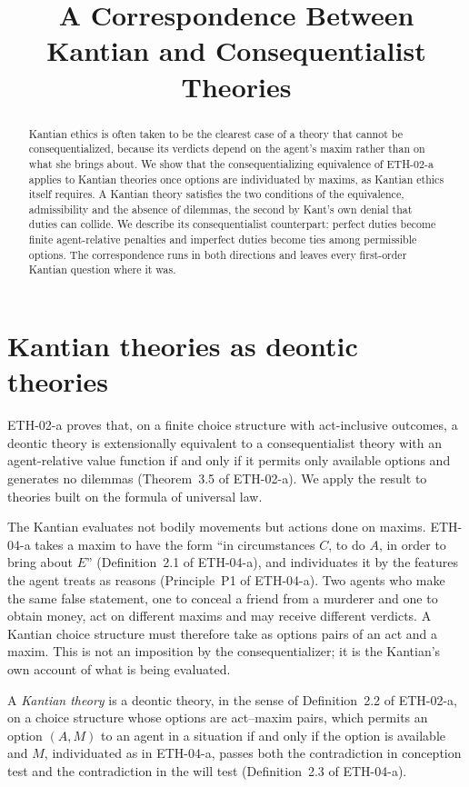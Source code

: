 \documentclass{situationist-preprint}
\title{A Correspondence Between Kantian and Consequentialist Theories}
\begin{document}
\maketitle

\begin{abstract}
Kantian ethics is often taken to be the clearest case of a theory that cannot be consequentialized, because its verdicts depend on the agent's maxim rather than on what she brings about. We show that the consequentializing equivalence of ETH-02-a applies to Kantian theories once options are individuated by maxims, as Kantian ethics itself requires. A Kantian theory satisfies the two conditions of the equivalence, admissibility and the absence of dilemmas, the second by Kant's own denial that duties can collide. We describe its consequentialist counterpart: perfect duties become finite agent-relative penalties and imperfect duties become ties among permissible options. The correspondence runs in both directions and leaves every first-order Kantian question where it was.
\end{abstract}

\section{Kantian theories as deontic theories}

ETH-02-a proves that, on a finite choice structure with act-inclusive outcomes, a deontic theory is extensionally equivalent to a consequentialist theory with an agent-relative value function if and only if it permits only available options and generates no dilemmas (Theorem~3.5 of ETH-02-a). We apply the result to theories built on the formula of universal law.

The Kantian evaluates not bodily movements but actions done on maxims. ETH-04-a takes a maxim to have the form \enquote{in circumstances $C$, to do $A$, in order to bring about $E$} (Definition~2.1 of ETH-04-a), and individuates it by the features the agent treats as reasons (Principle~P1 of ETH-04-a). Two agents who make the same false statement, one to conceal a friend from a murderer and one to obtain money, act on different maxims and may receive different verdicts. A Kantian choice structure must therefore take as options pairs of an act and a maxim. This is not an imposition by the consequentializer; it is the Kantian's own account of what is being evaluated.

\begin{definition}\label{d:kantian}
A \emph{Kantian theory} is a deontic theory, in the sense of Definition~2.2 of ETH-02-a, on a choice structure whose options are act--maxim pairs, which permits an option $(A, M)$ to an agent in a situation if and only if the option is available and $M$, individuated as in ETH-04-a, passes both the contradiction in conception test and the contradiction in the will test (Definition~2.3 of ETH-04-a).
\end{definition}
\end{document}
